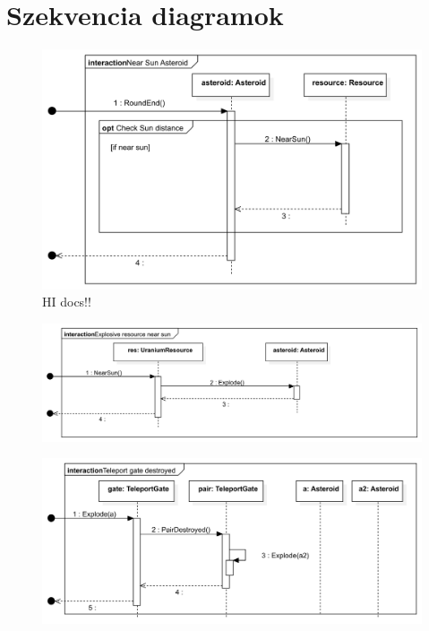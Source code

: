 \section{Szekvencia diagramok}
\begin{figure}[H] 
\centering 
\includegraphics[width=1\textwidth]{docs/3_Project/svg/Design Model!Sun Distance!Asteroid near sun!Near Sun Asteroid_6.png} 
\caption{HI docs!!} 
\end{figure} 

\begin{figure}[H] 
\centering 
\includegraphics[width=1\textwidth]{docs/3_Project/svg/Design Model!Sun Distance!Resource Explosion!Explosive resource near sun_7.png} 
\end{figure} 

\begin{figure}[H] 
\centering 
\includegraphics[width=1\textwidth]{docs/3_Project/svg/Design Model!Sun Distance!Teleport gate destroyed!Teleport gate destroyed_8.png} 
\end{figure} 

